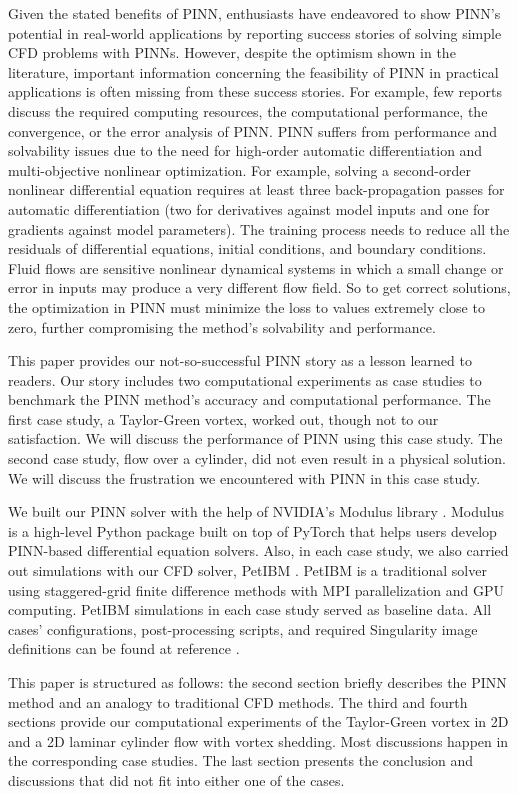 Given the stated benefits of PINN, enthusiasts have endeavored to show PINN's potential in real-world applications by reporting success stories of solving simple CFD problems with PINNs. 
However, despite the optimism shown in the literature, important information concerning the feasibility of PINN in practical applications is often missing from these success stories.
For example, few reports discuss the required computing resources, the computational performance, the convergence, or the error analysis of PINN.
PINN suffers from performance and solvability issues due to the need for high-order automatic differentiation and multi-objective nonlinear optimization.
For example, solving a second-order nonlinear differential equation requires at least three back-propagation passes for automatic differentiation (two for derivatives against model inputs and one for gradients against model parameters).
The training process needs to reduce all the residuals of differential equations, initial conditions, and boundary conditions.
Fluid flows are sensitive nonlinear dynamical systems in which a small change or error in inputs may produce a very different flow field.
So to get correct solutions, the optimization in PINN must minimize the loss to values extremely close to zero, further compromising the method's solvability and performance.

This paper provides our not-so-successful PINN story as a lesson learned to readers.
Our story includes two computational experiments as case studies to benchmark the PINN method's accuracy and computational performance.
The first case study, a Taylor-Green vortex, worked out, though not to our satisfaction.
We will discuss the performance of PINN using this case study.
The second case study, flow over a cylinder, did not even result in a physical solution.
We will discuss the frustration we encountered with PINN in this case study.

We built our PINN solver with the help of NVIDIA's Modulus library \cite{noauthor_modulus_nodate}.
Modulus is a high-level Python package built on top of PyTorch that helps users develop PINN-based differential equation solvers.
Also, in each case study, we also carried out simulations with our CFD solver, PetIBM \cite{chuang_petibm_2018}.
PetIBM is a traditional solver using staggered-grid finite difference methods with MPI parallelization and GPU computing.
PetIBM simulations in each case study served as baseline data.
All cases' configurations, post-processing scripts, and required Singularity image definitions can be found at reference \cite{pi_yueh_chuang_2022_6592457}.

This paper is structured as follows: the second section briefly describes the PINN method and an analogy to traditional CFD methods.
The third and fourth sections provide our computational experiments of the Taylor-Green vortex in 2D and a 2D laminar cylinder flow with vortex shedding.
Most discussions happen in the corresponding case studies.
The last section presents the conclusion and discussions that did not fit into either one of the cases.
